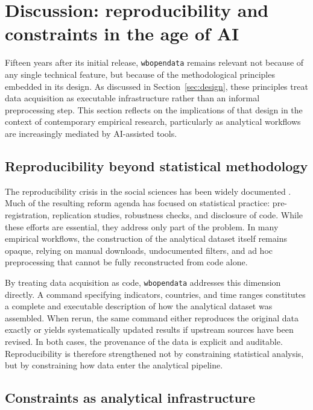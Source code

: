 \documentclass[bib]{statapress}
\begin{document}
\section{Discussion: reproducibility and constraints in the age of AI}\label{sec:discussion}

Fifteen years after its initial release, \texttt{wbopendata} remains relevant not
because of any single technical feature, but because of the methodological
principles embedded in its design. As discussed in Section~\ref{sec:design}, these principles
treat data acquisition as executable infrastructure rather than an informal
preprocessing step. This section reflects on the implications of that design in
the context of contemporary empirical research, particularly as analytical
workflows are increasingly mediated by AI-assisted tools.

\subsection{Reproducibility beyond statistical methodology}

The reproducibility crisis in the social sciences has been widely documented
\citep{baker2016reproducibility,opensc2015estimating}. Much of the resulting reform
agenda has focused on statistical practice: pre-registration, replication
studies, robustness checks, and disclosure of code. While these efforts are
essential, they address only part of the problem. In many empirical workflows,
the construction of the analytical dataset itself remains opaque, relying on
manual downloads, undocumented filters, and ad hoc preprocessing that cannot be
fully reconstructed from code alone.

By treating data acquisition as code, \texttt{wbopendata} addresses this
dimension directly. A command specifying indicators, countries, and time ranges
constitutes a complete and executable description of how the analytical dataset
was assembled. When rerun, the same command either reproduces the original data
exactly or yields systematically updated results if upstream sources have been
revised. In both cases, the provenance of the data is explicit and auditable.
Reproducibility is therefore strengthened not by constraining statistical
analysis, but by constraining how data enter the analytical pipeline.

\subsection{Constraints as analytical infrastructure}
\end{document}
